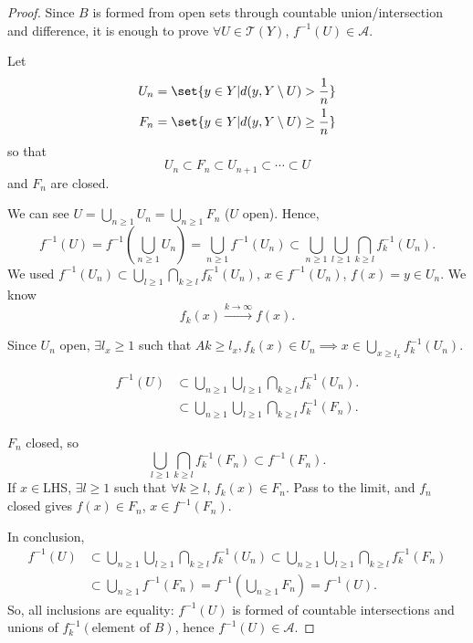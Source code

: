 \documentclass{article}
\begin{document}
\begin{proof}
    Since $B$ is formed from open sets through countable union/intersection and difference, it is enough to prove $\forall U \in \mathscr{T}(Y)$, $f^{-1}(U) \in \mathscr{A}$.

    Let
    \begin{align*}
        U_n &= \set{y \in Y | d(y, Y \setminus U) > \frac{1}{n}} \\
        F_n &= \set{y \in Y | d(y, Y \setminus U) \geq \frac{1}{n}} \\
    \end{align*}
    so that
    \begin{equation*}
        U_n \subset F_n \subset U_{n+1} \subset \dotsb \subset U
    \end{equation*}
    and $F_n$ are closed.

    We can see $U = \bigcup_{n \geq 1} U_n = \bigcup_{n \geq 1} F_n$ ($U$ open). %
    Hence,
    \begin{equation*}
        f^{-1}(U) = f^{-1} \left(\bigcup_{n \geq 1} U_n\right) = \bigcup_{n \geq 1} f^{-1}(U_n) \subset \bigcup_{n \geq 1} \bigcup_{l \geq 1} \bigcap_{k \geq l} f^{-1}_k(U_n).
    \end{equation*}
    We used $f^{-1}(U_n) \subset \bigcup_{l \geq 1} \bigcap_{k \geq l} f_k^{-1}(U_n)$, $x \in f^{-1}(U_n)$, $f(x) = y \in U_n$.
    We know
    \begin{equation*}
        f_k(x) \xrightarrow{k \to \infty} f(x).
    \end{equation*}

    Since $U_n$ open, $\exists l_x \geq 1$ such that $A k \geq l_x, f_k(x) \in U_n \implies x \in \bigcup_{x \geq l_x} f_k^{-1}(U_n)$.

    \begin{align*}
        f^{-1}(U) &\subset \bigcup_{n \geq 1} \bigcup_{l \geq 1} \bigcap_{k \geq l} f_k^{-1}(U_n). \\
        &\subset \bigcup_{n \geq 1} \bigcup_{l \geq 1} \bigcap_{k \geq l} f_k^{-1}(F_n).
    \end{align*}

    $F_n$ closed, so
    \begin{equation*}
        \bigcup_{l \geq 1} \bigcap_{k \geq l} f_k^{-1} (F_n) \subset f^{-1}(F_n).
    \end{equation*}
    If $x \in $LHS, $\exists l \geq 1$ such that $\forall k \geq l$, $f_k(x) \in F_n$.
    Pass to the limit, and $f_n$ closed gives $f(x) \in F_n$, $x \in f^{-1}(F_n)$.

    In conclusion,
    \begin{align*}
        f^{-1}(U) &\subset \bigcup_{n \geq 1} \bigcup_{l \geq 1} \bigcap_{k \geq l} f_k^{-1}(U_n) \subset \bigcup_{n \geq 1} \bigcup_{l \geq 1} \bigcap_{k \geq l} f_k^{-1}(F_n) \\
                  & \subset \bigcup_{n \geq 1} f^{-1}(F_n) = f^{-1}\left(\bigcup_{n \geq 1} F_n\right) = f^{-1}(U).
    \end{align*}
    So, all inclusions are equality: $f^{-1}(U)$ is formed of countable intersections and unions of $f_k^{-1}(\text{element of }B)$, hence $f^{-1}(U) \in \mathscr{A}$.
\end{proof}
\end{document}
